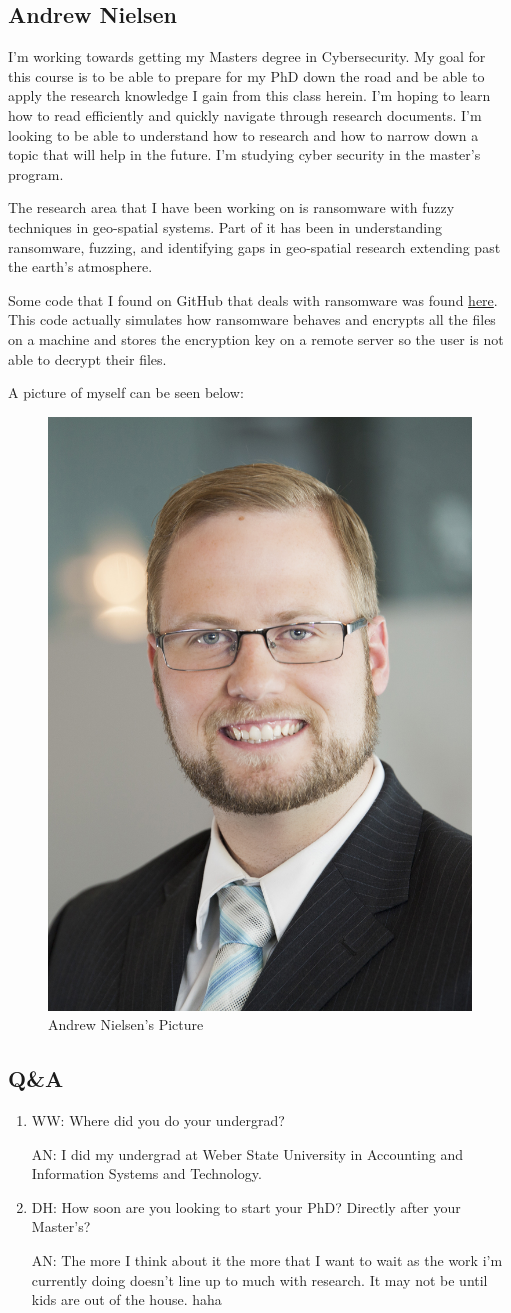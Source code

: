 \subsection{Andrew Nielsen}

I'm working towards getting my Masters degree in Cybersecurity. My goal for this course is to be able to prepare for my PhD down the road and be able to apply the research knowledge I gain from this class herein. I'm hoping to learn how to read efficiently and quickly navigate through research documents. I'm looking to be able to understand how to research and how to narrow down a topic that will help in the future. I'm studying cyber security in the master's program. 

The research area that I have been working on is ransomware with fuzzy techniques in geo-spatial systems. Part of it has been in understanding ransomware, fuzzing, and identifying gaps in geo-spatial research extending past the earth's atmosphere.

Some code that I found on GitHub that deals with ransomware was found \href{https://github.com/mauri870/ransomware.git}{here}. This code actually simulates how ransomware behaves and encrypts all the files on a machine and stores the encryption key on a remote server so the user is not able to decrypt their files. 


A picture of myself can be seen below:

\begin{figure}[htp]\centering
\includegraphics[width=.3\textwidth]{Andrew Professional picture.jpg}
\caption{Andrew Nielsen's Picture}
\label{fig:Andrew Professional picture}
\end{figure}

\subsection{Q&A}

\begin{enumerate}
    \item WW: Where did you do your undergrad?

	AN: I did my undergrad at Weber State University in Accounting and Information Systems and Technology. 

    \item DH: How soon are you looking to start your PhD? Directly after your Master's?

	AN: The more I think about it the more that I want to wait as the work i'm currently doing doesn't line up to much with research. It may not be until kids are out of the house. haha
\end{enumerate}


